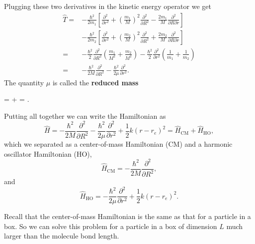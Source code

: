 \documentclass[../Main/chem331-notes.tex]{subfiles}
\begin{document}
Plugging these two derivatives in the kinetic energy operator we get
\begin{align}
\hat{T} = & -\frac{\hbar^2}{2 m_1} \left[
\frac{\partial^2}{\partial r^2} + \left(\frac{m_1}{M}\right)^2\frac{\partial^2}{\partial R^2} - \frac{2 m_1}{M}\frac{\partial^2}{\partial R \partial r}
\right] \\
  & -\frac{\hbar^2}{2 m_2} 
   \left[
\frac{\partial^2}{\partial r^2} + \left(\frac{m_2}{M}\right)^2\frac{\partial^2}{\partial R^2} + \frac{2 m_2}{M}\frac{\partial^2}{\partial R \partial r}
   \right] \\
= &  -\frac{\hbar^2}{2} \frac{\partial^2}{\partial R^2} \left(\frac{m_1}{M^2} + \frac{m_2}{M^2}\right)   -\frac{\hbar^2}{2} \frac{\partial^2}{\partial r^2} \left(\frac{1}{m_1} + \frac{1}{m_2}  \right)  \\
= & -\frac{\hbar^2}{2M} \frac{\partial^2}{\partial R^2} -\frac{\hbar^2}{2 \mu} \frac{\partial^2}{\partial r^2} .
\end{align}
The quantity $\mu$ is called the \textbf{reduced mass}
\begin{iequation}
\mu =  +  = .
\end{iequation}
Putting all together we can write the Hamiltonian as
\begin{equation}
\hat{H} =  -\frac{\hbar^2}{2M} \frac{\partial^2}{\partial R^2} -\frac{\hbar^2}{2 \mu} \frac{\partial^2}{\partial r^2} + \frac{1}{2} k (r - r_e)^2 = \hat{H}_\mathrm{CM} + \hat{H}_\mathrm{HO},
\end{equation}
which we separated as a center-of-mass Hamiltonian (CM) and a harmonic oscillator Hamiltonian (HO),
\begin{equation}
\hat{H}_\mathrm{CM} = -\frac{\hbar^2}{2M} \frac{\partial^2}{\partial R^2},
\end{equation}
and
\begin{equation}
\hat{H}_\mathrm{HO} = -\frac{\hbar^2}{2 \mu} \frac{\partial^2}{\partial r^2} + \frac{1}{2} k (r - r_e)^2.
\end{equation}

Recall that the center-of-mass Hamiltonian is the same as that for a particle in a box. So we can solve this problem for a particle in a box of dimension $L$ much larger than the molecule bond length. 
\end{document}
